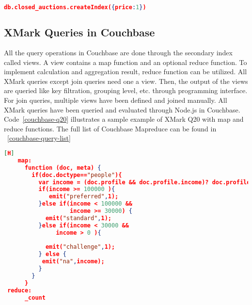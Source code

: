 \begin{lstlisting}[language=JSON, caption=MongoDB secondary Index, label=mongodb-create-index, basicstyle=\scriptsize]
   db.closed_auctions.createIndex({price:1})
\end{lstlisting}

\subsection{XMark Queries in Couchbase}
 All the query operations in Couchbase are done through the secondary index called views. A view contains a map function and an optional reduce function.
To implement calculation and aggregation result,  reduce function can be utilized. All XMark queries except join queries need one a view. Then, the output of the views are queried like key filtration, grouping level, etc. through programming interface. For join queries, multiple views have been defined and joined manually. All XMark queries have been queried and evaluated through Node.js in Couchbase. 
Code~\ref{couchbase-q20} illustrates a sample example of XMark  Q20 with map and reduce functions. The full list of Couchbase Mapreduce can be found in ~\ref{couchbase-query-list}
\begin{lstlisting}[language=JSON, caption=XMark query Q20 in Couchbase Server, label=couchbase-q20,  basicstyle=\scriptsize][H]
	map:
	  function (doc, meta) {
	    if(doc.doctype=="people"){
	      var income = (doc.profile && doc.profile.income)? doc.profile.income : 0;
	      if(income >= 100000 ){
	    	 emit("preferred",1);
	      }else if(income < 100000 && 
	               income >= 30000) {
	        emit("standard",1);
	      }else if(income < 30000 &&
	           income > 0 ){
	       
	        emit("challenge",1);
	      } else {
	       emit("na",income);
	      }
	    }
	  }
 reduce:
	  _count
\end{lstlisting}

